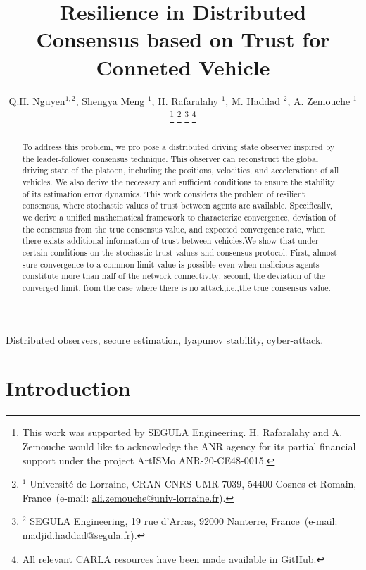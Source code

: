 \documentclass[letterpaper, 10pt, conference]{ieeeconf}  %
\begin{document}
\title{\bf Resilience in Distributed
 Consensus based on Trust for Conneted Vehicle }
\author{Q.H. Nguyen$^{1,2}$, Shengya Meng $^{1}$, H. Rafaralahy $^{1}$, M. Haddad $^{2}$, A. Zemouche $^{1}$
%
\thanks{This work was supported by SEGULA Engineering. H. Rafaralahy and A. Zemouche would like to acknowledge the ANR agency for its partial financial support under the project ArtISMo ANR-20-CE48-0015.
}
%
\thanks{$^{1}$ Universit\'e de Lorraine, CRAN  CNRS UMR 7039, 54400 Cosnes et Romain, France~(e-mail: \protect\url{ali.zemouche@univ-lorraine.fr}).}
%
\thanks{$^{2}$ SEGULA Engineering, 19 rue d'Arras, 92000 Nanterre, France~(e-mail: \protect\url{madjid.haddad@segula.fr}).}
%
\thanks{All relevant CARLA resources have been made available in \protect\href{https://github.com/kslhuy/CACC_UIO_simulink}{GitHub}.}
}
\maketitle

\begin{abstract}

 To address this problem, we pro
pose a distributed driving state observer inspired by the leader-follower consensus technique. This observer can reconstruct the global driving state of the platoon, including the positions, velocities, and accelerations of all vehicles. We also derive the necessary and sufficient conditions to ensure the stability of its estimation error dynamics.
This work considers the problem of resilient consensus, where stochastic values of trust between agents are available. Specifically, we derive a unified mathematical framework to characterize convergence, deviation of the consensus from the true consensus value, and expected convergence rate, when there exists additional information of trust between vehicles.We show that under certain conditions on the stochastic trust values and consensus protocol: First, almost sure convergence to a common limit value is
possible even when malicious agents constitute more than half of the network connectivity; second, the deviation of the converged limit,
from the case where there is no attack,i.e.,the true consensus value.
\end{abstract}

\begin{keywords}
Distributed observers, secure estimation, lyapunov stability, cyber-attack.
\end{keywords}

\section{Introduction}
\end{document}
